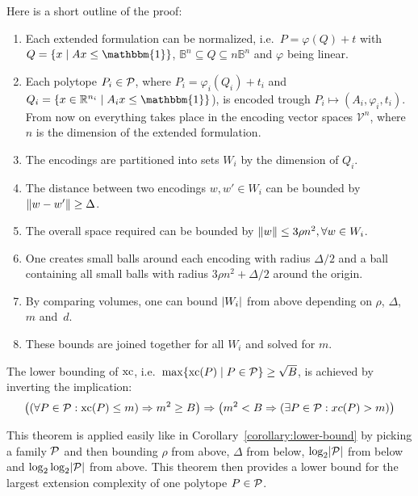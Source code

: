 Here is a short outline of the proof:
\begin{enumerate}
  \item Each extended formulation can be normalized, i.e.\ $P = \varphi(Q) + t$ with\\ $Q = \{ x \mid Ax \leq \mathbbm{1} \}$, $\mathbb{B}^n \subseteq Q \subseteq n\mathbb{B}^n$ and $\varphi$ being linear.
  \item Each polytope $P_i \in \P$, where $P_i = \varphi_i(Q_i) + t_i$ and $Q_i = \{ x \in \R^{n_i} \mid A_ix \leq \mathbbm{1} \}$), is encoded trough $P_i \mapsto (A_i, \varphi_i, t_i)$.\\
        From now on everything takes place in the encoding vector spaces $\mathcal{V}^n$, where $n$ is the dimension of the extended formulation.
  \item The encodings are partitioned into sets $W_i$ by the dimension of $Q_i$.
  \item The distance between two encodings $w, w' \in W_i$ can be bounded by $\norm{w - w'} \geq \Delta$.
  \item The overall space required can be bounded by $\norm{w} \leq 3\rho n^2, \forall w \in W_i$.
  \item One creates small balls around each encoding with radius $\Delta/2$ and a ball containing all small balls with radius $3\rho n^2 + \Delta/2$ around the origin.
  \item By comparing volumes, one can bound $\abs{W_i}$ from above depending on $\rho$, $\Delta$, $m$ and~$d$.
  \item These bounds are joined together for all $W_i$ and solved for $m$.
\end{enumerate}

The lower bounding of $\xc$, i.e.\ $\max \{\xc(P) \mid P \in \P\}  \geq \sqrt{B}$, is achieved by inverting the implication:
$$ \left( \left( \forall P\in\P: \xc(P) \leq m \right) \Rightarrow m^2 \geq B \right) \Rightarrow \left( m^2 < B \Rightarrow \left( \exists P\in\P: xc(P) > m \right) \right) $$

This theorem is applied easily like in Corollary~\ref{corollary:lower-bound} by picking a family $\P$ and then bounding $\rho$ from above, $\Delta$ from below, $\log_2 \abs{\P}$ from below and $\log_2\log_2 \abs{\P}$ from above. This theorem then provides a lower bound for the largest extension complexity of one polytope $P \in \P$.
